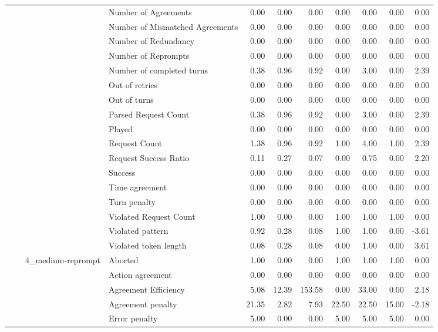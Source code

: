 \begin{tabular}{llllrrrrrrr}
 &  &  & Number of Agreements & 0.00 & 0.00 & 0.00 & 0.00 & 0.00 & 0.00 & 0.00 \\
 &  &  & Number of Mismatched Agreements & 0.00 & 0.00 & 0.00 & 0.00 & 0.00 & 0.00 & 0.00 \\
 &  &  & Number of Redundancy & 0.00 & 0.00 & 0.00 & 0.00 & 0.00 & 0.00 & 0.00 \\
 &  &  & Number of Reprompts & 0.00 & 0.00 & 0.00 & 0.00 & 0.00 & 0.00 & 0.00 \\
 &  &  & Number of completed turns & 0.38 & 0.96 & 0.92 & 0.00 & 3.00 & 0.00 & 2.39 \\
 &  &  & Out of retries & 0.00 & 0.00 & 0.00 & 0.00 & 0.00 & 0.00 & 0.00 \\
 &  &  & Out of turns & 0.00 & 0.00 & 0.00 & 0.00 & 0.00 & 0.00 & 0.00 \\
 &  &  & Parsed Request Count & 0.38 & 0.96 & 0.92 & 0.00 & 3.00 & 0.00 & 2.39 \\
 &  &  & Played & 0.00 & 0.00 & 0.00 & 0.00 & 0.00 & 0.00 & 0.00 \\
 &  &  & Request Count & 1.38 & 0.96 & 0.92 & 1.00 & 4.00 & 1.00 & 2.39 \\
 &  &  & Request Success Ratio & 0.11 & 0.27 & 0.07 & 0.00 & 0.75 & 0.00 & 2.20 \\
 &  &  & Success & 0.00 & 0.00 & 0.00 & 0.00 & 0.00 & 0.00 & 0.00 \\
 &  &  & Time agreement & 0.00 & 0.00 & 0.00 & 0.00 & 0.00 & 0.00 & 0.00 \\
 &  &  & Turn penalty & 0.00 & 0.00 & 0.00 & 0.00 & 0.00 & 0.00 & 0.00 \\
 &  &  & Violated Request Count & 1.00 & 0.00 & 0.00 & 1.00 & 1.00 & 1.00 & 0.00 \\
 &  &  & Violated pattern & 0.92 & 0.28 & 0.08 & 1.00 & 1.00 & 0.00 & -3.61 \\
 &  &  & Violated token length & 0.08 & 0.28 & 0.08 & 0.00 & 1.00 & 0.00 & 3.61 \\
\cline{3-11}
 &  & \multirow[t]{27}{*}{4_medium-reprompt} & Aborted & 1.00 & 0.00 & 0.00 & 1.00 & 1.00 & 1.00 & 0.00 \\
 &  &  & Action agreement & 0.00 & 0.00 & 0.00 & 0.00 & 0.00 & 0.00 & 0.00 \\
 &  &  & Agreement Efficiency & 5.08 & 12.39 & 153.58 & 0.00 & 33.00 & 0.00 & 2.18 \\
 &  &  & Agreement penalty & 21.35 & 2.82 & 7.93 & 22.50 & 22.50 & 15.00 & -2.18 \\
 &  &  & Error penalty & 5.00 & 0.00 & 0.00 & 5.00 & 5.00 & 5.00 & 0.00 \\

\end{tabular}
